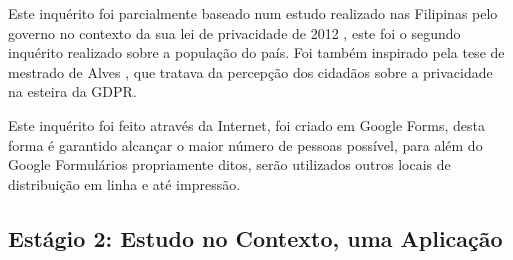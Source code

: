 \documentclass[conference]{IEEEtran}
\begin{document}

Este inquérito foi parcialmente baseado num estudo realizado nas Filipinas
pelo governo no contexto da sua lei de privacidade de 2012 \cite{Philippine2022Conduct},
este foi o segundo inquérito realizado sobre a população do país. Foi também
inspirado pela tese de mestrado de Alves \cite{alves2021}, que tratava da
percepção dos cidadãos sobre a privacidade na esteira da GDPR.


Este inquérito foi feito através da Internet, foi criado em Google Forms,
desta forma é garantido alcançar o maior número de pessoas possível, para
além do Google Formulários propriamente ditos, serão utilizados outros locais
de distribuição em linha e até impressão.


\subsection{Estágio 2: Estudo no Contexto, uma Aplicação}
\end{document}
